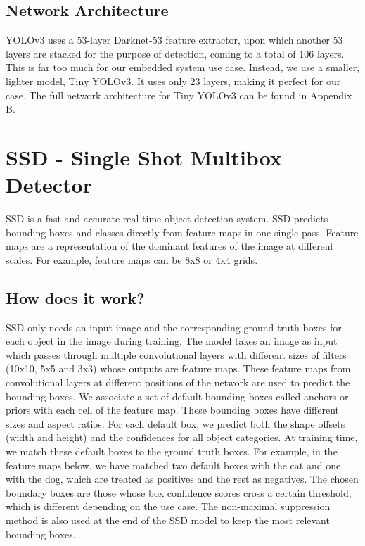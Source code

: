 \documentclass[12pt,letterpaper]{article}
\begin{document}
\subsection{Network Architecture}

YOLOv3 uses a 53-layer Darknet-53 feature extractor, upon which another 53 layers are stacked for the purpose of detection, coming to a total of 106 layers. This is far too much for our embedded system use case. Instead, we use a smaller, lighter model, Tiny YOLOv3.  It uses only 23 layers, making it perfect for our case. The full network architecture for Tiny YOLOv3 can be found in Appendix B.

\section{SSD - Single Shot Multibox Detector}

SSD is a fast and accurate real-time object detection system. SSD predicts bounding boxes and classes directly from feature maps in one single pass. Feature maps are a representation of the dominant features of the image at different scales. For example, feature maps can be 8x8 or 4x4 grids.

\subsection{How does it work?}

SSD only needs an input image and the corresponding ground truth boxes for each object in the image during training. The model takes an image as input which passes through multiple convolutional layers with different sizes of filters (10x10, 5x5 and 3x3) whose outputs are feature maps. These feature maps from convolutional layers at different positions of the network are used to predict the bounding boxes. We associate a set of default bounding boxes called anchors or priors with each cell of the feature map. These bounding boxes have different sizes and aspect ratios. For each default box, we predict both the shape offsets (width and height) and the confidences for all object categories. At training time, we match these default boxes to the ground truth boxes. For example, in the feature maps below, we have matched two default boxes with the cat and one with the dog, which are treated as positives and the rest as negatives. The chosen boundary boxes are those whose box confidence scores cross a certain threshold, which is different depending on the use case. The non-maximal suppression method is also used at the end of the SSD model to keep the most relevant bounding boxes.
\end{document}
